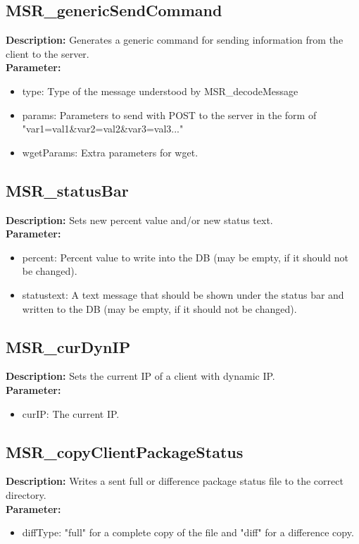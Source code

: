 \subsection{MSR\_genericSendCommand}
\textbf{Description:} Generates a generic command for sending information from the client to the server.\\
\textbf{Parameter:}
\begin{itemize}
\item type: Type of the message understood by MSR\_decodeMessage
\item params: Parameters to send with POST to the server in the form of "var1=val1\&var2=val2\&var3=val3..."
\item wgetParams: Extra parameters for wget.
\end{itemize}

\subsection{MSR\_statusBar}
\textbf{Description:} Sets new percent value and/or new status text.\\
\textbf{Parameter:}
\begin{itemize}
\item percent: Percent value to write into the DB (may be empty, if it should not be changed).
\item statustext: A text message that should be shown under the status bar and written to the DB (may be empty, if it should not be changed).
\end{itemize}

\subsection{MSR\_curDynIP}
\textbf{Description:} Sets the current IP of a client with dynamic IP.\\
\textbf{Parameter:}
\begin{itemize}
\item curIP: The current IP.
\end{itemize}

\subsection{MSR\_copyClientPackageStatus}
\textbf{Description:} Writes a sent full or difference package status file to the correct directory.\\
\textbf{Parameter:}
\begin{itemize}
\item diffType: "full" for a complete copy of the file and "diff" for a difference copy.
\end{itemize}

